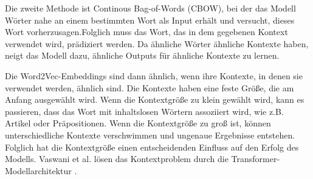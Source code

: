 \documentclass[12pt,letterpaper,ngerman]{article}
\begin{document}
Die zweite Methode ist Continous Bag-of-Words (CBOW),
bei der das Modell Wörter nahe an einem bestimmten Wort als Input 
erhält und versucht, dieses Wort vorherzusagen.Folglich muss das Wort,
das in dem gegebenen Kontext verwendet wird, prädiziert werden.
Da ähnliche Wörter ähnliche Kontexte haben, neigt das Modell dazu,
ähnliche Outputs für ähnliche Kontexte zu lernen. 

Die Word2Vec-Embeddings sind dann ähnlich, wenn ihre Kontexte,
in denen sie verwendet werden, ähnlich sind.  
Die Kontexte haben eine feste Größe, die am Anfang ausgewählt wird.
Wenn die Kontextgröße zu klein gewählt wird, kann es passieren, dass 
das Wort mit inhaltslosen Wörtern assoziiert wird, wie z.B. Artikel 
oder Präpositionen. Wenn die Kontextgröße zu groß ist, können 
unterschiedliche Kontexte verschwimmen und ungenaue Ergebnisse entstehen.
Folglich hat die Kontextgröße einen entscheidenden Einfluss auf den Erfolg 
des Modells. Vaswani et al. lösen das Kontextproblem 
durch die Transformer-Modellarchitektur  \cite{transformer}.
\end{document}
